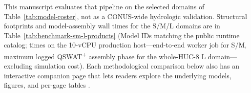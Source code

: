This manuscript evaluates that pipeline on the selected domains of Table~\ref{tab:model-roster}, not as a CONUS-wide hydrologic validation. Structural footprints and model-assembly wall times for the S/M/L domains are in Table~\ref{tab:benchmark-sm-l-products} (Model IDs matching the public runtime catalog; times on the 10-vCPU production host---end-to-end worker job for S/M, maximum logged QSWAT\textsuperscript{+} assembly phase for the whole-HUC-8 L domain---excluding simulation cost). Each methodological comparison below also has an interactive companion page that lets readers explore the underlying models, figures, and per-gage tables \citep{SWATGenXcompanion}.
